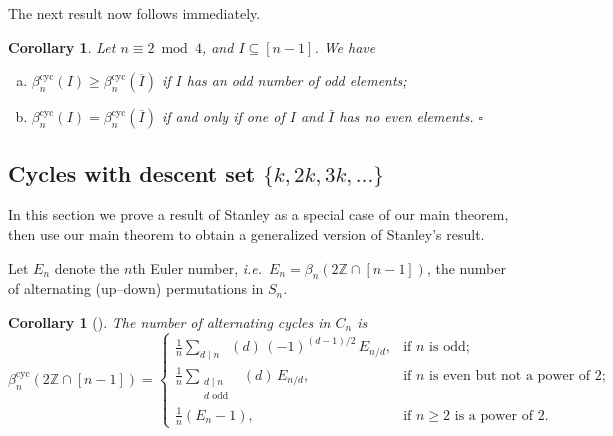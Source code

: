 \documentclass[12pt]{article}
\newcommand{\Perm}{S}
\newcommand{\Cyc}{C}
\newcommand{\betacyc}{\beta^{\text{cyc}}}
\DeclareMathOperator{\mob}{M\ddot{o}b}
\newtheorem{cor}[thm]{Corollary}
\theoremstyle{definition}
\begin{document}
The next result now follows immediately.

\begin{cor} \label{complementcor} Let $n \equiv 2 \bmod 4$, and $I \subseteq [n-1]$. We have
\begin{enumerate}[(a)]
\item $\betacyc_n(I) \ge \betacyc_n(\overline{I})$ if $I$ has an odd number of odd elements;
\item $\betacyc_n(I) = \betacyc_n(\overline{I})$ if and only if one of $I$ and $\overline{I}$ has no even elements. 
\hfill $\square$
\end{enumerate}
\end{cor}


\subsection{Cycles with descent set $\{k, 2k, 3k, \ldots\}$} \label{sec:Stanley}

In this section we prove a result of Stanley as a special case of our main theorem, then use our main theorem to obtain a generalized version of Stanley's result.

Let $E_n$ denote the $n$th Euler number, \textit{i.e.}\ $E_n = \beta_n(2\mathbb{Z} \cap [n-1])$, the number of alternating (up--down) permutations in $\Perm_n$.

\begin{cor}[{\cite[Thm.\ 5.3]{StanleyAlt}}]\label{alternating} The number of alternating cycles in $\Cyc_n$ is
$$\betacyc_n(2\mathbb{Z} \cap [n-1])=\begin{cases}
\frac{1}{n}\sum_{\text{$d \mid n$}} \mob(d)\,(-1)^{(d-1)/2}\,E_{n/d}, & \text{if $n$ is odd;}\\
\frac{1}{n}\sum_{\substack{\text{$d \mid n$}\\\text{$d$ odd}}} \mob(d)\,E_{n/d}, & \text{if $n$ is even but not a power of 2;}\\
\frac{1}{n}\left(E_n - 1\right), & \text{if $n \ge 2$ is a power of $2$.}
\end{cases}$$
\end{cor}
\end{document}

